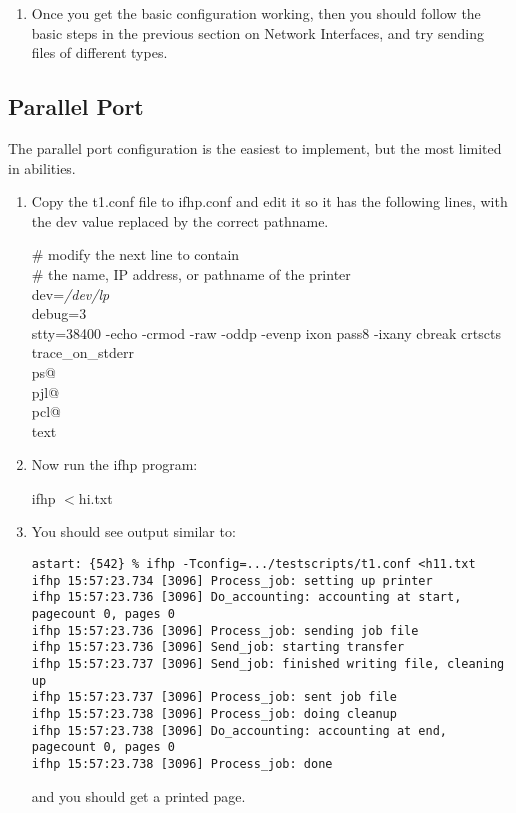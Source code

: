 \documentclass[a4paper]{article}
\begin{document}
\begin{enumerate}
\item Once you get the basic configuration working,
then you should follow the basic steps in the
previous section on Network Interfaces,
and try sending files of different types.
\end{enumerate}



\subsection{Parallel Port}

The parallel port configuration is the easiest to implement,
but the most limited in abilities.
\begin{enumerate}
\item Copy the
{\ttfamily t1.conf}
file to
{\ttfamily ifhp.conf} and edit it
so it has the following lines, with the
{\ttfamily dev} value replaced by the correct pathname.
\begin{tscreen}
\# modify the next line to contain \\ 
\#  the name, IP address, or pathname of the printer \\ 
dev={\itshape /dev/lp\/} \\ 
debug=3 \\ 
stty=38400 -echo -crmod -raw -oddp -evenp ixon pass8 -ixany cbreak crtscts \\ 
trace\_on\_stderr \\ 
ps@ \\ 
pjl@ \\ 
pcl@ \\ 
text \\ 
\end{tscreen}
\item Now run the
{\ttfamily ifhp}
program:
\begin{tscreen}
ifhp $<$hi.txt
\end{tscreen}
\item You should see output similar to:
\begin{tscreen}
\begin{verbatim}
astart: {542} % ifhp -Tconfig=.../testscripts/t1.conf <h11.txt
ifhp 15:57:23.734 [3096] Process_job: setting up printer
ifhp 15:57:23.736 [3096] Do_accounting: accounting at start, pagecount 0, pages 0
ifhp 15:57:23.736 [3096] Process_job: sending job file
ifhp 15:57:23.736 [3096] Send_job: starting transfer
ifhp 15:57:23.737 [3096] Send_job: finished writing file, cleaning up
ifhp 15:57:23.737 [3096] Process_job: sent job file
ifhp 15:57:23.738 [3096] Process_job: doing cleanup
ifhp 15:57:23.738 [3096] Do_accounting: accounting at end, pagecount 0, pages 0
ifhp 15:57:23.738 [3096] Process_job: done
\end{verbatim}
\end{tscreen}

and you should get a printed page.
\end{enumerate}
\end{document}
